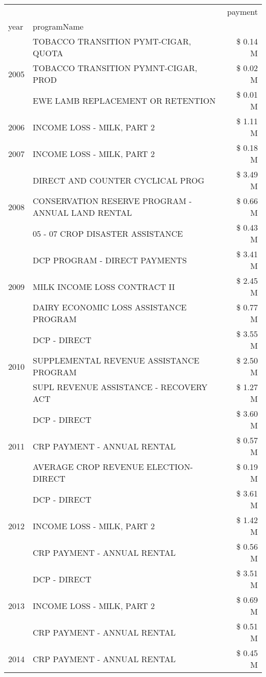 \begin{tabular}{llr}
\toprule
 &  & payment \\
year & programName &  \\
\midrule
\multirow[t]{3}{*}{2005} & TOBACCO TRANSITION PYMT-CIGAR, QUOTA & \$ 0.14 M \\
 & TOBACCO TRANSITION PYMNT-CIGAR, PROD & \$ 0.02 M \\
 & EWE LAMB REPLACEMENT OR RETENTION & \$ 0.01 M \\
\cline{1-3}
2006 & INCOME LOSS - MILK, PART 2 & \$ 1.11 M \\
\cline{1-3}
2007 & INCOME LOSS - MILK, PART 2 & \$ 0.18 M \\
\cline{1-3}
\multirow[t]{3}{*}{2008} & DIRECT AND COUNTER CYCLICAL PROG & \$ 3.49 M \\
 & CONSERVATION RESERVE PROGRAM - ANNUAL LAND RENTAL & \$ 0.66 M \\
 & 05 - 07 CROP DISASTER ASSISTANCE & \$ 0.43 M \\
\cline{1-3}
\multirow[t]{3}{*}{2009} & DCP PROGRAM - DIRECT PAYMENTS & \$ 3.41 M \\
 & MILK INCOME LOSS CONTRACT II & \$ 2.45 M \\
 & DAIRY ECONOMIC LOSS ASSISTANCE PROGRAM & \$ 0.77 M \\
\cline{1-3}
\multirow[t]{3}{*}{2010} & DCP - DIRECT & \$ 3.55 M \\
 & SUPPLEMENTAL REVENUE ASSISTANCE PROGRAM & \$ 2.50 M \\
 & SUPL REVENUE ASSISTANCE - RECOVERY ACT & \$ 1.27 M \\
\cline{1-3}
\multirow[t]{3}{*}{2011} & DCP - DIRECT & \$ 3.60 M \\
 & CRP PAYMENT - ANNUAL RENTAL & \$ 0.57 M \\
 & AVERAGE CROP REVENUE ELECTION-DIRECT & \$ 0.19 M \\
\cline{1-3}
\multirow[t]{3}{*}{2012} & DCP - DIRECT & \$ 3.61 M \\
 & INCOME LOSS - MILK, PART 2 & \$ 1.42 M \\
 & CRP PAYMENT - ANNUAL RENTAL & \$ 0.56 M \\
\cline{1-3}
\multirow[t]{3}{*}{2013} & DCP - DIRECT & \$ 3.51 M \\
 & INCOME LOSS - MILK, PART 2 & \$ 0.69 M \\
 & CRP PAYMENT - ANNUAL RENTAL & \$ 0.51 M \\
\cline{1-3}
\multirow[t]{3}{*}{2014} & CRP PAYMENT - ANNUAL RENTAL & \$ 0.45 M \\

\end{tabular}
